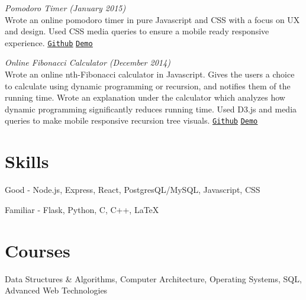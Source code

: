 \documentclass[margin]{res}
\begin{document}
\begin{resume}
\textit{Pomodoro Timer (January 2015)}\\ Wrote an online pomodoro timer in pure Javascript and CSS with a focus on UX and design. Used CSS media queries to ensure a mobile ready responsive experience. \underline{\texttt{\href{https://github.com/keithyong/pomodoro}{Github}}} \underline{\texttt{\href{http://keithy.me/pomodoro}{Demo}}}


\textit{Online Fibonacci Calculator (December 2014)}\\ Wrote an online nth-Fibonacci calculator in Javascript. Gives the users a choice to calculate using dynamic programming or recursion, and notifies them of the running time. Wrote an explanation under the calculator which analyzes how dynamic programming significantly reduces running time. Used D3.js and media queries to make mobile responsive recursion tree visuals. \underline{\texttt{\href{https://github.com/keithyong/fibonacci-calc}{Github}}} \underline{\texttt{\href{http://keithy.me/fibonacci-calc}{Demo}}}


\section{Skills}
Good - Node.js, Express, React, PostgresQL/MySQL, Javascript, CSS

Familiar - Flask, Python, C, C++, LaTeX

\section{Courses}
Data Structures \& Algorithms, Computer Architecture, Operating Systems, SQL, Advanced Web Technologies
\end{resume}
\end{document}
